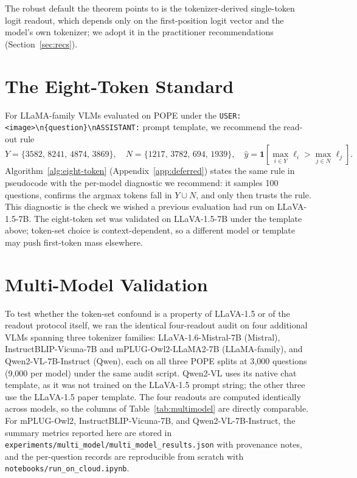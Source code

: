 \documentclass{article}
\begin{document}
The robust default the theorem points to is the tokenizer-derived
single-token logit readout, which depends only on the first-position
logit vector and the model's own tokenizer; we adopt it in the
practitioner recommendations (Section~\ref{sec:recs}).

\section{The Eight-Token Standard}
\label{sec:standard}
\label{sec:discussion}

For LLaMA-family VLMs evaluated on POPE under the
\texttt{USER:\,<image>\textbackslash n\{question\}\textbackslash nASSISTANT:}
prompt template, we recommend the read-out rule
\begin{equation}
Y = \{3582,\, 8241,\, 4874,\, 3869\},\quad
N = \{1217,\, 3782,\, 694,\, 1939\},\quad
\hat{y} = \mathbf{1}\!\left[\max_{i \in Y} \ell_i > \max_{j \in N} \ell_j\right].
\label{eq:rule}
\end{equation}
Algorithm~\ref{alg:eight-token} (Appendix~\ref{app:deferred}) states the
same rule in pseudocode with the per-model diagnostic we recommend: it
samples 100 questions, confirms the argmax tokens fall in $Y \cup N$, and
only then trusts the rule. This diagnostic is the check we wished a
previous evaluation had run on LLaVA-1.5-7B. The eight-token set was
validated on LLaVA-1.5-7B under the template above; token-set choice is
context-dependent, so a different model or template may push first-token
mass elsewhere.

\section{Multi-Model Validation}
\label{sec:crossmodel}

To test whether the token-set confound is a property of LLaVA-1.5 or of
the readout protocol itself, we ran the identical four-readout audit on
four additional VLMs spanning three tokenizer families:
LLaVA-1.6-Mistral-7B (Mistral), InstructBLIP-Vicuna-7B and
mPLUG-Owl2-LLaMA2-7B (LLaMA-family), and Qwen2-VL-7B-Instruct (Qwen),
each on all three POPE splits at 3{,}000 questions (9{,}000 per model)
under the same audit script. Qwen2-VL uses its native chat template, as
it was not trained on the LLaVA-1.5 prompt string; the other three use
the LLaVA-1.5 paper template. The four readouts are computed identically
across models, so the columns of Table~\ref{tab:multimodel} are directly
comparable. For
mPLUG-Owl2, InstructBLIP-Vicuna-7B, and Qwen2-VL-7B-Instruct, the summary
metrics reported here are stored in
\texttt{experiments/multi\_model/multi\_model\_results.json} with
provenance notes, and the per-question records are reproducible from
scratch with \texttt{notebooks/run\_on\_cloud.ipynb}.
\end{document}
